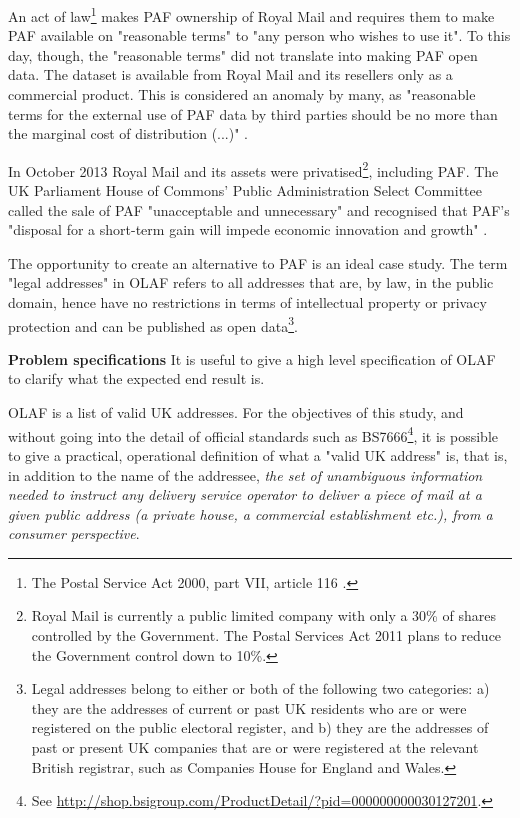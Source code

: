 An act of law\footnote{The Postal Service Act 2000, part VII, article 116 \cite{postalserviceact2000}.} makes PAF ownership of Royal Mail and requires them to make PAF available on "reasonable terms" to "any person who wishes to use it". To this day, though, the "reasonable terms" did not translate into making PAF open data. The dataset is available from Royal Mail and its resellers only as a commercial product. This is considered an anomaly by many, as "reasonable terms for the external use of PAF data by third parties should be no more than the marginal cost of distribution (...)" \cite{odugresponse}. 

In October 2013 Royal Mail and its assets were privatised\footnote{Royal Mail is currently a public limited company with only a 30\% of shares controlled by the Government. The Postal Services Act 2011 \cite{postalserviceact2011} plans to reduce the Government control down to 10\%.}, including PAF. The UK Parliament House of Commons' Public Administration Select Committee called the sale of PAF "unacceptable and unnecessary" and recognised that PAF's "disposal for a short-term gain will impede economic innovation and growth" \cite{pascod}.

The opportunity to create an alternative to PAF is an ideal case study. The term "legal addresses" in OLAF refers to all addresses that are, by law, in the public domain, hence have no restrictions in terms of intellectual property or privacy protection and can be published as open data\footnote{Legal addresses belong to either or both of the following two categories: a) they are the addresses of current or past UK residents who are or were registered on the public electoral register, and b) they are the addresses of past or present UK companies that are or were registered at the relevant British registrar, such as Companies House for England and Wales.}.

\textbf{Problem specifications} It is useful to give a high level specification of OLAF to clarify what the expected end result is. 

OLAF is a list of valid UK addresses. For the objectives of this study, and without going into the detail of official standards such as BS7666\footnote{See \url{http://shop.bsigroup.com/ProductDetail/?pid=000000000030127201}.}, it is possible to give a practical, operational definition of what a "valid UK address" is, that is, in addition to the name of the addressee, {\it the set of unambiguous information needed to instruct any delivery service operator to deliver a piece of mail at a given public address (a private house, a commercial establishment etc.), from a consumer perspective}. 

